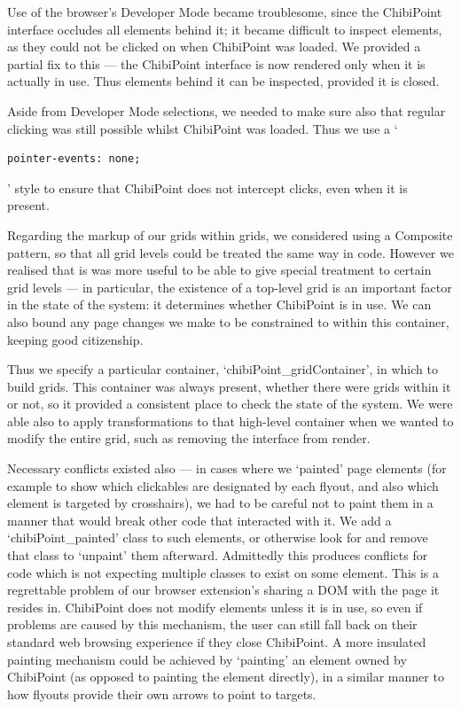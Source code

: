 \documentclass[a4paper, 12pt]{report}
\begin{document}
Use of the browser's Developer Mode became troublesome, since the ChibiPoint interface occludes all elements behind it; it became difficult to inspect elements, as they could not be clicked on when ChibiPoint was loaded. We provided a partial fix to this --- the ChibiPoint interface is now rendered only when it is actually in use. Thus elements behind it can be inspected, provided it is closed.

Aside from Developer Mode selections, we needed to make sure also that regular clicking was still possible whilst ChibiPoint was loaded. Thus we use a `\begin{verbatim}pointer-events: none;\end{verbatim}' style to ensure that ChibiPoint does not intercept clicks, even when it is present.

Regarding the markup of our grids within grids, we considered using a Composite pattern\cite{gamma1994design}, so that all grid levels could be treated the same way in code. However we realised that is was more useful to be able to give special treatment to certain grid levels --- in particular, the existence of a top-level grid is an important factor in the state of the system: it determines whether ChibiPoint is in use. We can also bound any page changes we make to be constrained to within this container, keeping good citizenship.

Thus we specify a particular container, `chibiPoint\_gridContainer', in which to build grids. This container was always present, whether there were grids within it or not, so it provided a consistent place to check the state of the system. We were able also to apply transformations to that high-level container when we wanted to modify the entire grid, such as removing the interface from render.

Necessary conflicts existed also --- in cases where we `painted' page elements (for example to show which clickables are designated by each flyout, and also which element is targeted by crosshairs), we had to be careful not to paint them in a manner that would break other code that interacted with it. We add a `chibiPoint\_painted' class to such elements, or otherwise look for and remove that class to `unpaint' them afterward. Admittedly this produces conflicts for code which is not expecting multiple classes to exist on some element. This is a regrettable problem of our browser extension's sharing a DOM with the page it resides in. ChibiPoint does not modify elements unless it is in use, so even if problems are caused by this mechanism, the user can still fall back on their standard web browsing experience if they close ChibiPoint. A more insulated painting mechanism could be achieved by `painting' an element owned by ChibiPoint (as opposed to painting the element directly), in a similar manner to how flyouts provide their own arrows to point to targets.
\end{document}
